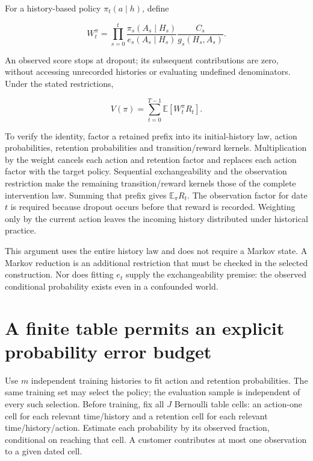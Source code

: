 For a history-based policy \(\pi_t(a\mid h)\), define

\[
 W_t^\pi=\prod_{s=0}^{t}
 \frac{\pi_s(A_s\mid H_s)}{e_s(A_s\mid H_s)}
 \frac{C_s}{g_s(H_s,A_s)}.
\]

An observed score stops at dropout; its subsequent contributions are
zero, without accessing unrecorded histories or evaluating undefined
denominators. Under the stated restrictions,

\[
 V(\pi)=\sum_{t=0}^{T-1}\mathbb E[W_t^\pi R_t].
\]

To verify the identity, factor a retained prefix into its
initial-history law, action probabilities, retention probabilities and
transition/reward kernels. Multiplication by the weight cancels each
action and retention factor and replaces each action factor with the
target policy. Sequential exchangeability and the observation
restriction make the remaining transition/reward kernels those of the
complete intervention law. Summing that prefix gives
\(\mathbb E_\pi R_t\). The observation factor for date \(t\) is required
because dropout occurs before that reward is recorded. Weighting only by
the current action leaves the incoming history distributed under
historical practice.

This argument uses the entire history law and does not require a Markov
state. A Markov reduction is an additional restriction that must be
checked in the selected construction. Nor does fitting \(e_t\) supply
the exchangeability premise: the observed conditional probability exists
even in a confounded world.

\hypertarget{a-finite-table-permits-an-explicit-probability-error-budget}{%
\section{A finite table permits an explicit probability error
budget}\label{a-finite-table-permits-an-explicit-probability-error-budget}}

Use \(m\) independent training histories to fit action and retention
probabilities. The same training set may select the policy; the
evaluation sample is independent of every such selection. Before
training, fix all \(J\) Bernoulli table cells: an action-one cell for
each relevant time/history and a retention cell for each relevant
time/history/action. Estimate each probability by its observed fraction,
conditional on reaching that cell. A customer contributes at most one
observation to a given dated cell.

